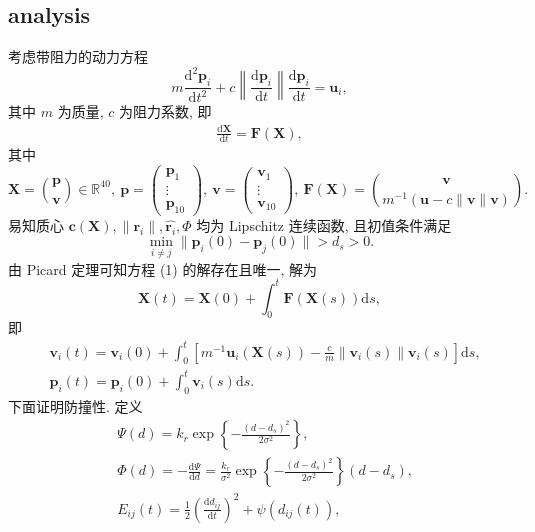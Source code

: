 \documentclass{article}
\theoremstyle{definition} %
\begin{document}
\subsection{analysis}
考虑带阻力的动力方程
\begin{equation*}
    m\frac{\mathrm{d}^2\boldsymbol{p}_i}{\mathrm{d}t^2}+c\left\|\frac{\mathrm{d}\boldsymbol{p}_i}{\mathrm{d}t}\right\|\frac{\mathrm{d}\boldsymbol{p}_i}{\mathrm{d}t}=\boldsymbol{u}_i,
\end{equation*}
其中 $m$ 为质量, $c$ 为阻力系数, 即
\begin{align}
    \frac{\mathrm{d}\boldsymbol{X}}{\mathrm{d}t}=\boldsymbol{F}(\boldsymbol{X}),
\end{align}
其中
\begin{equation*}
    \boldsymbol{X}=\binom{\boldsymbol{p}}{\boldsymbol{v}}\in\mathbb{R}^{40},\ \boldsymbol{p}=\begin{pmatrix}
        \boldsymbol{p}_1 \\\vdots\\\boldsymbol{p}_{10}
    \end{pmatrix},\ \boldsymbol{v}=\begin{pmatrix}
        \boldsymbol{v}_1 \\\vdots\\\boldsymbol{v}_{10}
    \end{pmatrix},\ \boldsymbol{F}(\boldsymbol{X})=\binom{\boldsymbol{v}}{m^{-1}(\boldsymbol{u}-c\|\boldsymbol{v}\|\boldsymbol{v})}.
\end{equation*}
易知质心 $\boldsymbol{c}(\boldsymbol{X}),\|\boldsymbol{r}_i\|,\widehat{\boldsymbol{r}_i},\mathit{\Phi}$ 均为 Lipschitz 连续函数, 且初值条件满足
\begin{equation*}
    \min_{i\ne j}\|\boldsymbol{p}_i(0)-\boldsymbol{p}_j(0)\|>d_s>0.
\end{equation*}
由 Picard 定理可知方程 (1) 的解存在且唯一, 解为
\begin{equation*}
    \boldsymbol{X}(t)=\boldsymbol{X}(0)+\int_0^t\boldsymbol{F}(\boldsymbol{X}(s))\mathrm{d}s,
\end{equation*}
即
\begin{align*}
     & \boldsymbol{v}_i(t)=\boldsymbol{v}_i(0)+\int_0^t\left[m^{-1}\boldsymbol{u}_i(\boldsymbol{X}(s))-\frac{c}{m}\|\boldsymbol{v}_i(s)\|\boldsymbol{v}_i(s)\right]\mathrm{d}s, \\
     & \boldsymbol{p}_i(t)=\boldsymbol{p}_i(0)+\int_0^t\boldsymbol{v}_i(s)\mathrm{d}s.
\end{align*}
下面证明防撞性. 定义
\begin{align*}
     & \mathit{\Psi}(d)=k_r\exp\left\{-\frac{(d-d_s)^2}{2\sigma^2}\right\},                                                                      \\
     & \mathit{\Phi}(d)=-\frac{\mathrm{d}\mathit{\Psi}}{\mathrm{d}d}=\frac{k_r}{\sigma^2}\exp\left\{-\frac{(d-d_s)^2}{2\sigma^2}\right\}(d-d_s), \\
     & E_{ij}(t)=\frac{1}{2}\left(\frac{\mathrm{d}d_{ij}}{\mathrm{d}t}\right)^2+\psi(d_{ij}(t)),
\end{align*}
\end{document}
